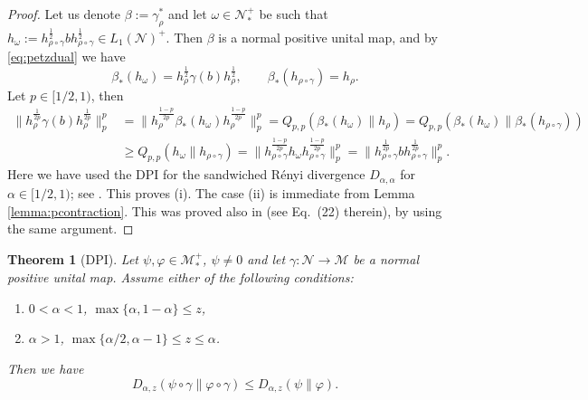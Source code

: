 \documentclass[12pt]{article}
\newtheorem{theorem}{Theorem}[section]
\theoremstyle{definition}
\theoremstyle{remark}
\numberwithin{equation}{section}
\def\Me{\mathcal M}
\def\Ne{\mathcal N}
\begin{document}
\begin{proof} Let us denote $\beta:=\gamma_\rho^*$ and let $\omega\in {\Ne_*^+}$ be such
that 
$h_\omega:=h_{\rho\circ\gamma}^{\frac12}bh_{\rho\circ\gamma}^{\frac12}\in L_1(\Ne)^+$. Then
$\beta$ is a normal positive unital map, and {by \eqref{eq:petzdual}} we have
\[
\beta_*(h_\omega)=h_\rho^{\frac12}\gamma(b)h_\rho^{\frac12},\qquad
\beta_*(h_{\rho\circ\gamma})=h_\rho.
\]
Let $p\in [1/2,1)$, then  
\begin{align*}
\Big\|h_{\rho}^{\frac{1}{2p}}\gamma(b)h_{\rho}^{\frac{1}{2p}}\Big\|^p_p
&=\Big\|h_\rho^{\frac{1-p}{2p}}\beta_*(h_\omega)h_\rho^{\frac{1-p}{2p}}\Big\|_p^p
=Q_{p,p}(\beta_*(h_\omega)\|h_\rho)=Q_{p,p}(\beta_*(h_\omega)\|\beta_*(h_{\rho\circ\gamma}))\\
&\ge  Q_{p,p}(h_\omega\|h_{\rho\circ\gamma})=\Big\|h_{\rho\circ\gamma}^{\frac{1-p}{2p}}h_\omega
h_{\rho\circ\gamma}^{\frac{1-p}{2p}}\Big\|_p^p
=\Big\|h_{\rho\circ\gamma}^{\frac{1}{2p}}bh_{\rho\circ\gamma}^{\frac{1}{2p}}\Big\|^p_p.
\end{align*}
Here we have used the DPI for the sandwiched R\'enyi  divergence $D_{\alpha,\alpha}$ for
$\alpha\in [1/2,1)$; see \cite[Theorem 4.1]{jencova2021renyi}. This proves (i).
The case (ii) is immediate from Lemma \ref{lemma:pcontraction}. This was proved also 
in \cite{kato2023onrenyi} (see Eq.~(22) therein), by using the same argument.
\end{proof}

\begin{theorem}[DPI] \label{thm:dpi}
Let $\psi,\varphi\in \Me_*^+$, $\psi\ne 0$ and let $\gamma:\Ne\to \Me$ be a normal positive
unital map. Assume either of the following conditions:
\begin{enumerate}
\item[(i)] $0<\alpha<1$, $\max\{\alpha,1-\alpha\}\le z$,
\item[(ii)] $\alpha>1$, $\max\{\alpha/2,\alpha-1\}\le z\le \alpha$.
\end{enumerate}
Then we have
\[
D_{\alpha,z}(\psi\circ\gamma\|\varphi\circ\gamma)\le D_{\alpha,z}(\psi\|\varphi).
\]
\end{theorem}
\end{document}
